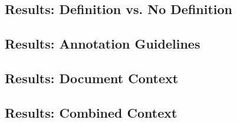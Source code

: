 
\subsection{Results: Definition vs. No Definition}
\label{sec:ctx_definition}


\subsection{Results: Annotation Guidelines}
\label{sec:ctx_guidelines}


\subsection{Results: Document Context}
\label{sec:ctx_document}


\subsection{Results: Combined Context}
\label{sec:ctx_combined}

